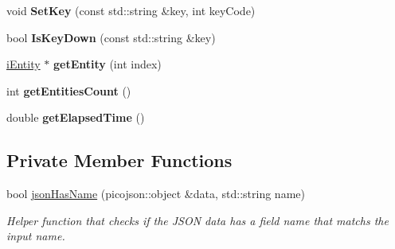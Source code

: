 \begin{DoxyCompactItemize}
void {\bfseries Set\+Key} (const std\+::string \&key, int key\+Code)
\item 
\mbox{\label{classSimulationFacade_a548f72a9ee7d092e64ef6b761c6e6af6}} 
bool {\bfseries Is\+Key\+Down} (const std\+::string \&key)
\item 
\mbox{\label{classSimulationFacade_a1b91420670088f189bcc8281570cb176}} 
\hyperlink{classiEntity}{i\+Entity} $\ast$ {\bfseries get\+Entity} (int index)
\item 
\mbox{\label{classSimulationFacade_a507d463dc1772f96a4791ff599826bcb}} 
int {\bfseries get\+Entities\+Count} ()
\item 
\mbox{\label{classSimulationFacade_af5865c718eb75347923ebcb55d1ebfed}} 
double {\bfseries get\+Elapsed\+Time} ()
\end{DoxyCompactItemize}
\subsection*{Private Member Functions}
\begin{DoxyCompactItemize}
\item 
\mbox{\label{classSimulationFacade_a6e44973f5bd3e4e27563050904dbf111}} 
bool \hyperlink{classSimulationFacade_a6e44973f5bd3e4e27563050904dbf111}{json\+Has\+Name} (picojson\+::object \&data, std\+::string name)
\begin{DoxyCompactList}\small\item\em Helper function that checks if the J\+S\+ON data has a field \textquotesingle{}name\textquotesingle{} that matchs the input name. \end{DoxyCompactList}\end{DoxyCompactItemize}
